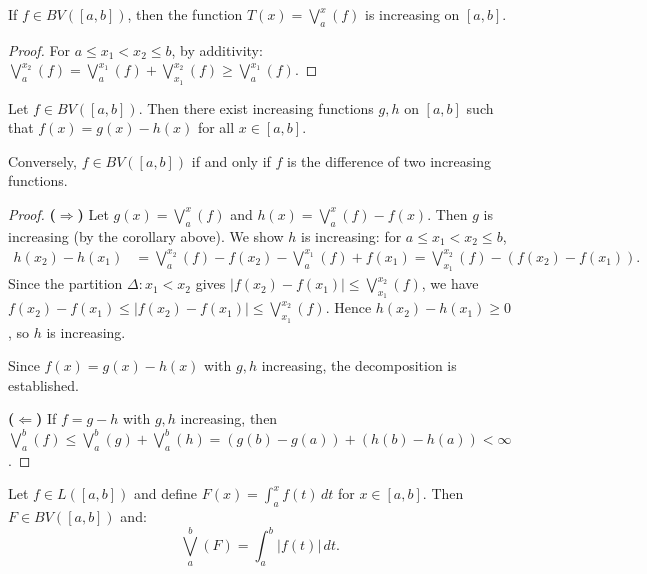 \documentclass[11pt]{report}
\begin{document}
\begin{corbox}
If $f \in BV([a,b])$, then the function $T(x) = \bigvee_a^x(f)$ is increasing on $[a, b]$.
\end{corbox}

\begin{proof}
For $a \leq x_1 < x_2 \leq b$, by additivity: $\bigvee_a^{x_2}(f) = \bigvee_a^{x_1}(f) + \bigvee_{x_1}^{x_2}(f) \geq \bigvee_a^{x_1}(f)$.
\end{proof}

\begin{thmbox}
Let $f \in BV([a, b])$. Then there exist increasing functions $g, h$ on $[a, b]$ such that $f(x) = g(x) - h(x)$ for all $x \in [a, b]$.

Conversely, $f \in BV([a, b])$ if and only if $f$ is the difference of two increasing functions.
\end{thmbox}

\begin{proof}
\textbf{($\Rightarrow$)} Let $g(x) = \bigvee_a^x(f)$ and $h(x) = \bigvee_a^x(f) - f(x)$. Then $g$ is increasing (by the corollary above). We show $h$ is increasing: for $a \leq x_1 < x_2 \leq b$,
\begin{align*}
h(x_2) - h(x_1) &= \bigvee_a^{x_2}(f) - f(x_2) - \bigvee_a^{x_1}(f) + f(x_1) = \bigvee_{x_1}^{x_2}(f) - (f(x_2) - f(x_1)).
\end{align*}
Since the partition $\Delta: x_1 < x_2$ gives $|f(x_2) - f(x_1)| \leq \bigvee_{x_1}^{x_2}(f)$, we have $f(x_2) - f(x_1) \leq |f(x_2) - f(x_1)| \leq \bigvee_{x_1}^{x_2}(f)$. Hence $h(x_2) - h(x_1) \geq 0$, so $h$ is increasing.

Since $f(x) = g(x) - h(x)$ with $g, h$ increasing, the decomposition is established.

\textbf{($\Leftarrow$)} If $f = g - h$ with $g, h$ increasing, then $\bigvee_a^b(f) \leq \bigvee_a^b(g) + \bigvee_a^b(h) = (g(b) - g(a)) + (h(b) - h(a)) < \infty$.
\end{proof}

\begin{thmbox}
Let $f \in L([a, b])$ and define $F(x) = \int_a^x f(t)\,dt$ for $x \in [a, b]$. Then $F \in BV([a, b])$ and:
\[
\bigvee_a^b(F) = \int_a^b |f(t)|\,dt.
\]
\end{thmbox}
\end{document}
